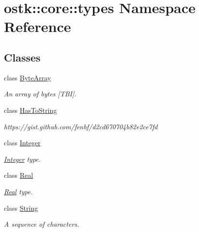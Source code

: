 \hypertarget{namespaceostk_1_1core_1_1types}{}\section{ostk\+:\+:core\+:\+:types Namespace Reference}
\label{namespaceostk_1_1core_1_1types}
\subsection*{Classes}
\begin{DoxyCompactItemize}
\item 
class \hyperlink{classostk_1_1core_1_1types_1_1_byte_array}{Byte\+Array}
\begin{DoxyCompactList}\small\item\em An array of bytes \mbox{[}T\+BI\mbox{]}. \end{DoxyCompactList}\item 
class \hyperlink{classostk_1_1core_1_1types_1_1_has_to_string}{Has\+To\+String}
\begin{DoxyCompactList}\small\item\em https\+://gist.github.\+com/fenbf/d2cd670704b82e2ce7fd \end{DoxyCompactList}\item 
class \hyperlink{classostk_1_1core_1_1types_1_1_integer}{Integer}
\begin{DoxyCompactList}\small\item\em \hyperlink{classostk_1_1core_1_1types_1_1_integer}{Integer} type. \end{DoxyCompactList}\item 
class \hyperlink{classostk_1_1core_1_1types_1_1_real}{Real}
\begin{DoxyCompactList}\small\item\em \hyperlink{classostk_1_1core_1_1types_1_1_real}{Real} type. \end{DoxyCompactList}\item 
class \hyperlink{classostk_1_1core_1_1types_1_1_string}{String}
\begin{DoxyCompactList}\small\item\em A sequence of characters. \end{DoxyCompactList}\end{DoxyCompactItemize}
